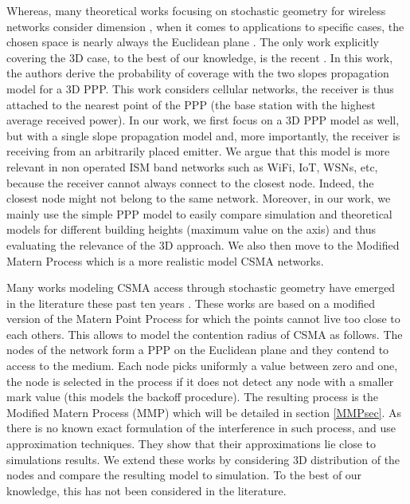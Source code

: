 \documentclass{sig-alternate-05-2015}
\begin{document}
Whereas, many theoretical works focusing on stochastic geometry for wireless networks consider dimension  \cite{baccelli09,haenggi09}, when it comes to applications to specific cases, the chosen space is nearly always the Euclidean plane \cite{nguyen07,baccelli09,elsawy13}. The only work explicitly covering the 3D case, to the best of our knowledge, is the recent \cite{gupta15}. In this work, the authors derive the probability of coverage with the two slopes propagation model for a 3D PPP. This work considers cellular networks, the receiver is thus attached to the nearest point of the PPP (the base station with the highest average received power). In our work, we first focus on a 3D PPP model as well, but with a single slope propagation model and, more importantly, the receiver is receiving from an arbitrarily placed emitter. We argue that this model is more relevant in non operated ISM band networks such as WiFi, IoT, WSNs, etc, because the receiver cannot always connect to the closest node. Indeed, the closest node might not belong to the same network. Moreover, in our work, we mainly use the simple PPP model to easily compare simulation and theoretical models for different building heights (maximum value on the  axis) and thus evaluating the relevance of the 3D approach. We also then move to the Modified Matern Process which is a more realistic model CSMA networks.

Many works modeling CSMA access through stochastic geometry have emerged in the literature these past ten years \cite{nguyen07,kaynia11,elsawy13}. These works are based on a modified version of the Matern Point Process for which the points cannot live too close to each others. This allows to model the contention radius of CSMA as follows. The nodes of the network form a PPP on the Euclidean plane and they contend to access to the medium. Each node picks uniformly a value between zero and one, the node is selected in the process if it does not detect any node with a smaller mark value (this models the backoff procedure). The resulting process is the Modified Matern Process (MMP) which will be detailed in section \ref{MMPsec}. As there is no known exact formulation of the interference in such process, \cite{nguyen07,kaynia11} and \cite{elsawy13} use approximation techniques. They show that their approximations lie close to simulations results. We extend these works by considering 3D distribution of the nodes and compare the resulting model to simulation. To the best of our knowledge, this has not been considered in the literature.
\end{document}
